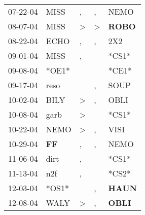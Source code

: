 \begin{supertabular}{p{0.07\textwidth}p{0.06\textwidth}p{0.02\textwidth}p{0.02\textwidth}p{0.06\textwidth}}
          07-22-04\textsuperscript{} &           MISS\textsuperscript{} &                , &                , &           NEMO\textsuperscript{} \\
          08-07-04\textsuperscript{} &           MISS\textsuperscript{} &     \textgreater &     \textgreater &  \textbf{ROBO\textsuperscript{}} \\
          08-22-04\textsuperscript{} &           ECHO\textsuperscript{} &                , &                , &            2X2\textsuperscript{} \\
          09-01-04\textsuperscript{} &           MISS\textsuperscript{} &                , &                  &                            *CS1* \\
          09-08-04\textsuperscript{} &                            *OE1* &                  &                  &                            *CE1* \\
          09-17-04\textsuperscript{} &           reso\textsuperscript{} &                  &                , &           SOUP\textsuperscript{} \\
          10-02-04\textsuperscript{} &           BILY\textsuperscript{} &     \textgreater &                , &           OBLI\textsuperscript{} \\
          10-08-04\textsuperscript{} &           garb\textsuperscript{} &     \textgreater &                  &                            *CS1* \\
          10-22-04\textsuperscript{} &           NEMO\textsuperscript{} &     \textgreater &                , &           VISI\textsuperscript{} \\
          10-29-04\textsuperscript{} &    \textbf{FF\textsuperscript{}} &                , &                , &           NEMO\textsuperscript{} \\
          11-06-04\textsuperscript{} &           dirt\textsuperscript{} &                , &                  &                            *CS1* \\
          11-13-04\textsuperscript{} &            n2f\textsuperscript{} &                , &                  &                            *CS2* \\
          12-03-04\textsuperscript{} &                            *OS1* &                  &                , &  \textbf{HAUN\textsuperscript{}} \\
          12-08-04\textsuperscript{} &           WALY\textsuperscript{} &     \textgreater &                , &  \textbf{OBLI\textsuperscript{}} \\

\end{supertabular}
